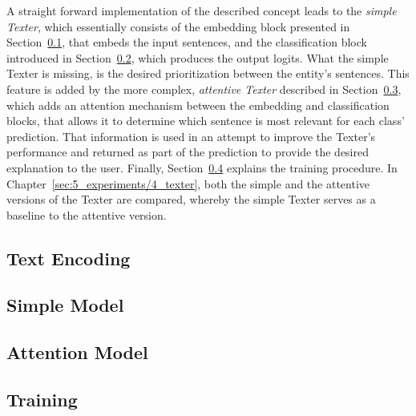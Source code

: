 A straight forward implementation of the described concept leads to the \emph{simple Texter}, which essentially consists of the embedding block presented in Section~\ref{subsec:4_approach/1_texter/1_text_embedding}, that embeds the input sentences, and the classification block introduced in Section~\ref{subsec:4_approach/1_texter/2_simple_model}, which produces the output logits. What the simple Texter is missing, is the desired prioritization between the entity's sentences. This feature is added by the more complex, \emph{attentive Texter} described in Section~\ref{subsec:4_approach/1_texter/3_attention_model}, which adds an attention mechanism between the embedding and classification blocks, that allows it to determine which sentence is most relevant for each class' prediction. That information is used in an attempt to improve the Texter's performance and returned as part of the prediction to provide the desired explanation to the user. Finally, Section~\ref{subsec:4_approach/1_texter/4_training} explains the training procedure. In Chapter~\ref{sec:5_experiments/4_texter}, both the simple and the attentive versions of the Texter are compared, whereby the simple Texter serves as a baseline to the attentive version.

\subsection{Text Encoding}
\label{subsec:4_approach/1_texter/1_text_embedding}


\subsection{Simple Model}
\label{subsec:4_approach/1_texter/2_simple_model}


\subsection{Attention Model}
\label{subsec:4_approach/1_texter/3_attention_model}


\subsection{Training}
\label{subsec:4_approach/1_texter/4_training}

